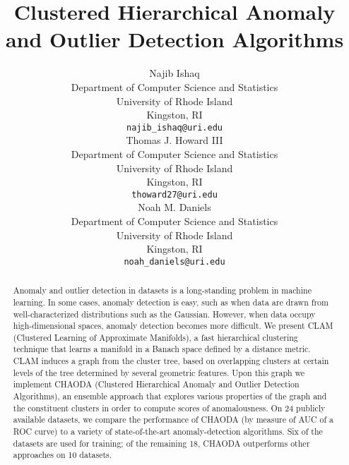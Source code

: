 \documentclass{article}
\title{Clustered Hierarchical Anomaly and Outlier Detection Algorithms}
\author{
    Najib Ishaq \\
    Department of Computer Science and Statistics\\
    University of Rhode Island\\
    Kingston, RI\\
    \texttt{najib\_ishaq@uri.edu} \\
    
    \And
    Thomas J. Howard III \\
    Department of Computer Science and Statistics\\
    University of Rhode Island\\
    Kingston, RI\\
    \texttt{thoward27@uri.edu} \\

    \AND
    Noah M. Daniels \\
    Department of Computer Science and Statistics\\
    University of Rhode Island\\
    Kingston, RI\\
    \texttt{noah\_daniels@uri.edu} \\
}
\begin{document}
    \maketitle

    \begin{abstract}
        Anomaly and outlier detection in datasets is a long-standing problem in machine learning.
        In some cases, anomaly detection is easy, such as when data are drawn from well-characterized distributions such as the Gaussian.
        However, when data occupy high-dimensional spaces, anomaly detection becomes more difficult.
        We present CLAM (Clustered Learning of Approximate Manifolds), a fast hierarchical clustering technique that learns a manifold in a Banach space defined by a distance metric.
        CLAM induces a graph from the cluster tree, based on overlapping clusters at certain levels of the tree determined by several geometric features.
        Upon this graph we implement CHAODA (Clustered Hierarchical Anomaly and Outlier Detection Algorithms), an ensemble approach that explores various properties of the graph and the constituent clusters in order to compute scores of anomalousness.
        On 24 publicly available datasets, we compare the performance of CHAODA (by measure of AUC of a ROC curve) to a variety of state-of-the-art anomaly-detection algorithms. Six of the datasets are used for training; of the remaining 18, 
        CHAODA outperforms other approaches on 10 datasets.
    \end{abstract}

    
    
    
    
    

    
    
\end{document}
